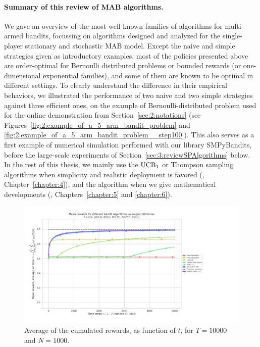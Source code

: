 \paragraph{Summary of this review of MAB algorithms.}
%
We gave an overview of the most well known families of algorithms for multi-armed bandits,
focussing on algorithms designed and analyzed for the single-player stationary and stochastic MAB model.
Except the naive and simple strategies given as introductory examples, most of the policies presented above are order-optimal for Bernoulli distributed problems or bounded rewards (or one-dimensional exponential families),
and some of them are known to be optimal in different settings.
%
To clearly understand the difference in their empirical behaviors, we illustrated the performance of two naive and two simple strategies against three efficient ones, on the example of Bernoulli-distributed problem used for the online demonstration from Section~\ref{sec:2:notations} (see Figures~\ref{fig:2:example_of_a_5_arm_bandit_problem} and \ref{fig:2:example_of_a_5_arm_bandit_problem__step100}).
This also serves as a first example of numerical simulation performed with our library SMPyBandits, before the large-scale experiments of Section~\ref{sec:3:reviewSPAlgorithms} below.
%
In the rest of this thesis, we mainly use the $\mathrm{UCB}_1$ or Thompson sampling algorithms when simplicity and realistic deployment is favored (\ie, Chapter~\ref{chapter:4}), and the \klUCB{} algorithm when we give mathematical developments (\ie, Chapters~\ref{chapter:5} and \ref{chapter:6}).



\begin{figure}[h!]  %
    \includegraphics[width=1.20\linewidth]{SP__K5_T10000_N1000__7_algos/main_MeanRewards____env1-1_2506036032481767447.pdf}
	\caption{Average of the cumulated rewards, as function of $t$, for $T=10000$ and $N=1000$.}
	\label{fig:2:meanRewardsAsFunctionOfTimeForDifferentAlgorithmsT10000N1000}
\end{figure}

